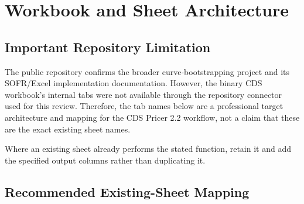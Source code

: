 \documentclass[11pt,a4paper]{article}
\begin{document}
\section{Workbook and Sheet Architecture}

\subsection{Important Repository Limitation}

The public repository confirms the broader curve-bootstrapping project and its SOFR/Excel implementation documentation. However, the binary CDS workbook's internal tabs were not available through the repository connector used for this review. Therefore, the tab names below are a professional target architecture and mapping for the CDS Pricer 2.2 workflow, not a claim that these are the exact existing sheet names.

Where an existing sheet already performs the stated function, retain it and add the specified output columns rather than duplicating it.

\subsection{Recommended Existing-Sheet Mapping}
\end{document}
